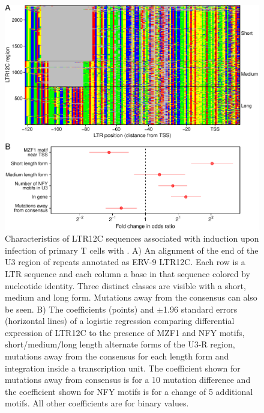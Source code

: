 \documentclass[../sherrill-Mix_thesis.tex]{subfiles}
\begin{document}
		\begin{figure}
			\centering
				\includegraphics[width=\textwidth]{ltr12c.pdf}
			\caption[Characteristics of LTR12C sequences associated with induction upon infection with \hivEight{}]{Characteristics of LTR12C sequences associated with induction upon infection of primary T cells with \hivEight{}.  A) An alignment of the \threePrime{} end of the U3 region of repeats annotated as ERV-9 LTR12C. Each row is a LTR sequence and each column a base in that sequence colored by nucleotide identity. Three distinct classes are visible with a short, medium and long form. Mutations away from the consensus can also be seen. B)  The coefficients (points) and $\pm$1.96 standard errors (horizontal lines) of a logistic regression comparing differential expression of LTR12C to the presence of MZF1 and NFY motifs, short/medium/long length alternate forms of the U3-R region, mutations away from the consensus for each length form and integration inside a transcription unit. The coefficient shown for mutations away from consensus is for a 10 mutation difference and the coefficient shown for NFY motifs is for a change of 5 additional motifs. All other coefficients are for binary values.}
			\label{figLtr12c}
		\end{figure}
\end{document}

